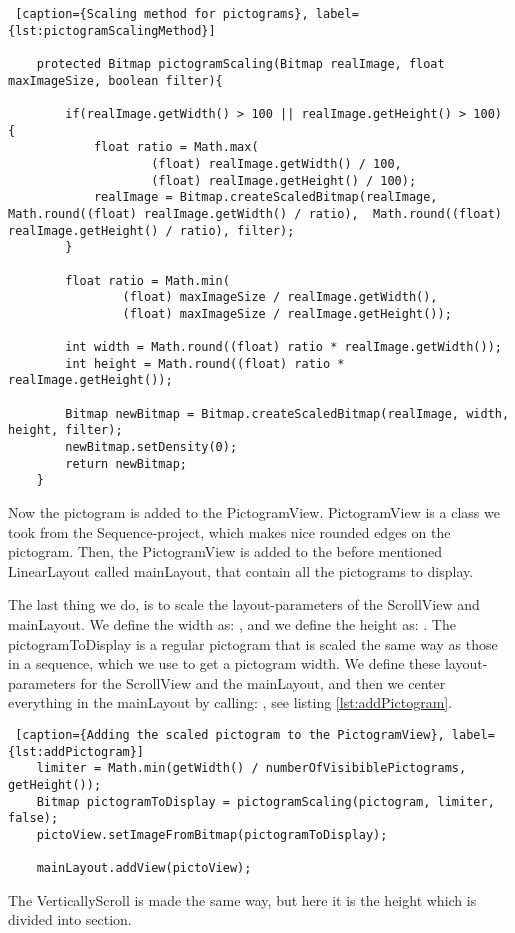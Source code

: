 \begin{lstlisting} [caption={Scaling method for pictograms}, label={lst:pictogramScalingMethod}]

    protected Bitmap pictogramScaling(Bitmap realImage, float maxImageSize, boolean filter){

        if(realImage.getWidth() > 100 || realImage.getHeight() > 100) {
            float ratio = Math.max(
                    (float) realImage.getWidth() / 100,
                    (float) realImage.getHeight() / 100);
            realImage = Bitmap.createScaledBitmap(realImage, Math.round((float) realImage.getWidth() / ratio),  Math.round((float) realImage.getHeight() / ratio), filter);
        }

        float ratio = Math.min(
                (float) maxImageSize / realImage.getWidth(),
                (float) maxImageSize / realImage.getHeight());

        int width = Math.round((float) ratio * realImage.getWidth());
        int height = Math.round((float) ratio * realImage.getHeight());

        Bitmap newBitmap = Bitmap.createScaledBitmap(realImage, width, height, filter);
        newBitmap.setDensity(0);
        return newBitmap;
    }
\end{lstlisting}

Now the pictogram is added to the PictogramView. PictogramView is a class we took from the Sequence-project, which makes nice rounded edges on the pictogram. Then, the PictogramView is added to the before mentioned LinearLayout called mainLayout, that contain all the pictograms to display.

The last thing we do, is to scale the layout-parameters of the ScrollView and mainLayout. We define the width as: , and we define the height as: . The pictogramToDisplay is a regular pictogram that is scaled the same way as those in a sequence, which we use to get a pictogram width. We define these layout-parameters for the ScrollView and the mainLayout, and then we center everything in the mainLayout by calling: , see listing \ref{lst:addPictogram}.

\begin{lstlisting} [caption={Adding the scaled pictogram to the PictogramView}, label={lst:addPictogram}]
	limiter = Math.min(getWidth() / numberOfVisibiblePictograms, getHeight());
	Bitmap pictogramToDisplay = pictogramScaling(pictogram, limiter, false);
	pictoView.setImageFromBitmap(pictogramToDisplay);
	
	mainLayout.addView(pictoView);
\end{lstlisting}

The VerticallyScroll is made the same way, but here it is the height which is divided into section.


